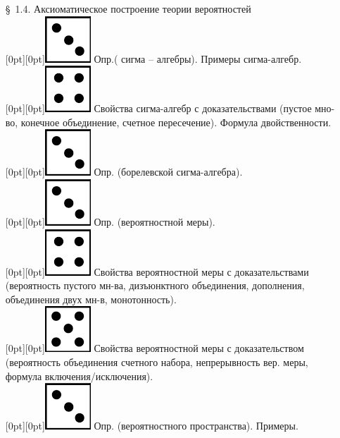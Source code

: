 \documentclass[10pt]{amsart}
\begin{document}
\begin{enumerate}
\begin{enumerate}
\item[\S\, 1.4.] Аксиоматическое построение теории вероятностей \\ 
 \raisebox{-1pt}[0pt][0pt]{\includegraphics[width=0.02\linewidth]{3.png}} Опр.( сигма – алгебры). Примеры сигма-алгебр. \\
 \raisebox{-1pt}[0pt][0pt]{\includegraphics[width=0.02\linewidth]{4.png}} Свойства сигма-алгебр с доказательствами (пустое мно-во, конечное объединение, счетное пересечение). Формула двойственности. \\
 \raisebox{-1pt}[0pt][0pt]{\includegraphics[width=0.02\linewidth]{3.png}} Опр. (борелевской сигма-алгебра). \\
 \raisebox{-1pt}[0pt][0pt]{\includegraphics[width=0.02\linewidth]{3.png}} Опр. (вероятностной меры). \\
 \raisebox{-1pt}[0pt][0pt]{\includegraphics[width=0.02\linewidth]{4.png}} Свойства вероятностной меры с доказательствами (вероятность пустого мн-ва, дизъюнктного объединения, дополнения, объединения двух мн-в, монотонность). \\
 \raisebox{-1pt}[0pt][0pt]{\includegraphics[width=0.02\linewidth]{5.png}} Свойства  вероятностной меры с доказательством (вероятность объединения счетного набора, непрерывность вер. меры, формула включения/исключения). \\
 \raisebox{-1pt}[0pt][0pt]{\includegraphics[width=0.02\linewidth]{3.png}} Опр. (вероятностного пространства). Примеры. \\


\end{enumerate}
\end{enumerate}
\end{document}
